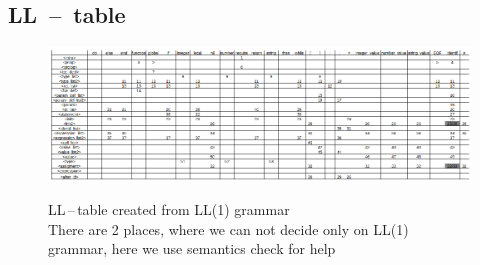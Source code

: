 \documentclass[11pt]{article}
\begin{document}
\begin{landscape}
    \section{LL\ --\ table}
    \begin{figure}[ht]
        \includegraphics[scale=1.89]{LL_tabulka.eps} 
        \label{LL-table}
        \caption{LL\,--\,table  created from LL(1) grammar\\There are 2 places, where we can not decide only on LL(1) grammar, here we use semantics check for help}
    \end{figure}
\end{landscape}



\end{document}
